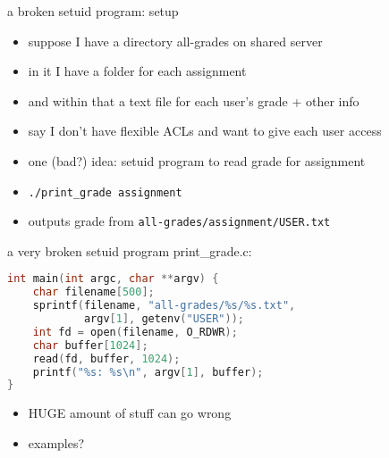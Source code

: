 \begin{frame}{a broken setuid program: setup}
    \begin{itemize}
    \item suppose I have a directory all-grades on shared server
    \item in it I have a folder for each assignment
    \item and within that a text file for each user's grade + other info
    \item say I don't have flexible ACLs and want to give each user access
    \vspace{.5cm}
    \item<2-> one (bad?) idea: setuid program to read grade for assignment
    \item<2-> \texttt{./print\_grade assignment}
    \item<2-> outputs grade from \texttt{all-grades/assignment/USER.txt}
    \end{itemize}
\end{frame}

\begin{frame}[fragile,label=brokenSetuid]{a very broken setuid program}
print\_grade.c:
\begin{lstlisting}[language=C,style=small]
int main(int argc, char **argv) {
    char filename[500];
    sprintf(filename, "all-grades/%s/%s.txt",
            argv[1], getenv("USER"));
    int fd = open(filename, O_RDWR);
    char buffer[1024];
    read(fd, buffer, 1024);
    printf("%s: %s\n", argv[1], buffer);
}
\end{lstlisting}
\begin{itemize}
\item HUGE amount of stuff can go wrong
\item examples?
\end{itemize}
\end{frame}
